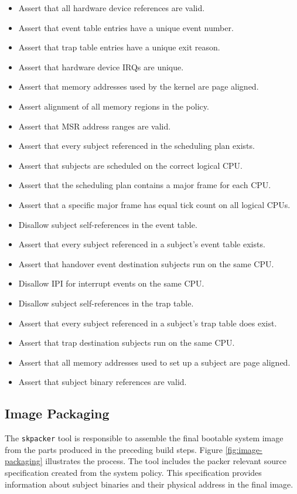 \begin{itemize}
	\item Assert that all hardware device references are valid.
	\item Assert that event table entries have a unique event number.
	\item Assert that trap table entries have a unique exit reason.
	\item Assert that hardware device IRQs are unique.
	\item Assert that memory addresses used by the kernel are page aligned.
	\item Assert alignment of all memory regions in the policy.
	\item Assert that MSR address ranges are valid.
	\item Assert that every subject referenced in the scheduling plan exists.
	\item Assert that subjects are scheduled on the correct logical CPU.
	\item Assert that the scheduling plan contains a major frame for each CPU.
	\item Assert that a specific major frame has equal tick count on all logical
		CPUs.
	\item Disallow subject self-references in the event table.
	\item Assert that every subject referenced in a subject's event table exists.
	\item Assert that handover event destination subjects run on the same CPU.
	\item Disallow IPI for interrupt events on the same CPU.
	\item Disallow subject self-references in the trap table.
	\item Assert that every subject referenced in a subject's trap table does
		exist.
	\item Assert that trap destination subjects run on the same CPU.
	\item Assert that all memory addresses used to set up a subject are page
		aligned.
	\item Assert that subject binary references are valid.
\end{itemize}

\subsection{Image Packaging}\label{subsec:image-packaging}
The \texttt{skpacker} tool is responsible to assemble the final bootable system
image from the parts produced in the preceding build steps. Figure
\ref{fig:image-packaging} illustrates the process. The tool includes the packer
relevant source specification created from the system policy. This specification
provides information about subject binaries and their physical address in the
final image.

